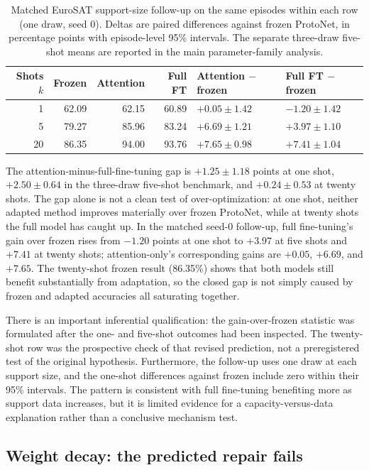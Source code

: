 \documentclass[11pt]{article}
\begin{document}
\begin{table}[t]
\centering
\small
\caption{Matched EuroSAT support-size follow-up on the same episodes within each row (one draw, seed 0). Deltas are paired differences against frozen ProtoNet, in percentage points with episode-level 95\% intervals. The separate three-draw five-shot means are reported in the main parameter-family analysis.}
\label{tab:shots}
\begin{tabularx}{\textwidth}{r r r r Y Y}
\toprule
Shots $k$ & Frozen & Attention & Full FT & Attention $-$ frozen & Full FT $-$ frozen\\
 & 62.09 & 62.15 & 60.89 & $+0.05\pm1.42$ & $-1.20\pm1.42$\\
5 & 79.27 & 85.96 & 83.24 & $+6.69\pm1.21$ & $+3.97\pm1.10$\\
20 & 86.35 & 94.00 & 93.76 & $+7.65\pm0.98$ & $+7.41\pm1.04$\\
\bottomrule
\end{tabularx}
\end{table}

The attention-minus-full-fine-tuning gap is $+1.25\pm1.18$ points at one shot, $+2.50\pm0.64$ in the three-draw five-shot benchmark, and $+0.24\pm0.53$ at twenty shots. The gap alone is not a clean test of over-optimization: at one shot, neither adapted method improves materially over frozen ProtoNet, while at twenty shots the full model has caught up. In the matched seed-0 follow-up, full fine-tuning's gain over frozen rises from $-1.20$ points at one shot to $+3.97$ at five shots and $+7.41$ at twenty shots; attention-only's corresponding gains are $+0.05$, $+6.69$, and $+7.65$. The twenty-shot frozen result (86.35\%) shows that both models still benefit substantially from adaptation, so the closed gap is not simply caused by frozen and adapted accuracies all saturating together.

There is an important inferential qualification: the gain-over-frozen statistic was formulated after the one- and five-shot outcomes had been inspected. The twenty-shot row was the prospective check of that revised prediction, not a preregistered test of the original hypothesis. Furthermore, the follow-up uses one draw at each support size, and the one-shot differences against frozen include zero within their 95\% intervals. The pattern is consistent with full fine-tuning benefiting more as support data increases, but it is limited evidence for a capacity-versus-data explanation rather than a conclusive mechanism test.

\subsection{Weight decay: the predicted repair fails}
\end{document}
